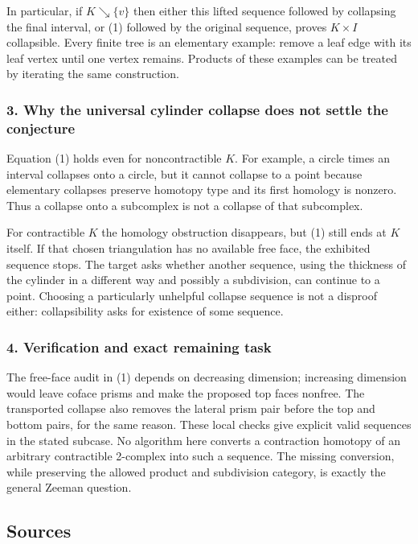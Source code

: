 \documentclass[11pt,a4paper]{article}
\begin{document}
In particular, if $K\searrow\{v\}$ then either this lifted sequence followed by collapsing the final interval, or (1) followed by the original sequence, proves $K\times I$ collapsible. Every finite tree is an elementary example: remove a leaf edge with its leaf vertex until one vertex remains. Products of these examples can be treated by iterating the same construction.

\subsubsection{3. Why the universal cylinder collapse does not settle the conjecture}
Equation (1) holds even for noncontractible $K$. For example, a circle times an interval collapses onto a circle, but it cannot collapse to a point because elementary collapses preserve homotopy type and its first homology is nonzero. Thus a collapse onto a subcomplex is not a collapse of that subcomplex.

For contractible $K$ the homology obstruction disappears, but (1) still ends at $K$ itself. If that chosen triangulation has no available free face, the exhibited sequence stops. The target asks whether another sequence, using the thickness of the cylinder in a different way and possibly a subdivision, can continue to a point. Choosing a particularly unhelpful collapse sequence is not a disproof either: collapsibility asks for existence of some sequence.

\subsubsection{4. Verification and exact remaining task}
The free-face audit in (1) depends on decreasing dimension; increasing dimension would leave coface prisms and make the proposed top faces nonfree. The transported collapse also removes the lateral prism pair before the top and bottom pairs, for the same reason. These local checks give explicit valid sequences in the stated subcase. No algorithm here converts a contraction homotopy of an arbitrary contractible 2-complex into such a sequence. The missing conversion, while preserving the allowed product and subdivision category, is exactly the general Zeeman question.

\subsection{Sources}
\end{document}
